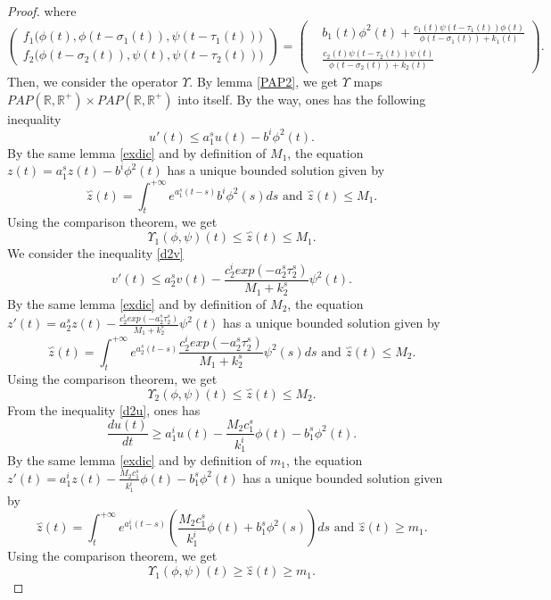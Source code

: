 \documentclass[[a4paper,10pt]{article}
\newcommand{\R}{\mathbb{R}}
\begin{document}
\begin{proof}
where{\small
\[ \left (\begin{aligned}
f_1\big(\phi(t),\phi(t-\sigma_1(t)),\psi(t-\tau_1(t))\big)\\
f_2\big(\phi(t-\sigma_2(t)),\psi(t),\psi(t-\tau_2(t))\big)
\end{aligned}
\right )=
\left (\begin{aligned}
&b_1(t)\phi^2(t)+\frac{c_1(t)\psi(t-\tau_1(t))\phi(t)}{\phi(t-\sigma_1(t))+k_1(t)}\\
&\frac{c_2(t)\psi(t-\tau_2(t))\psi(t)}{\phi(t-\sigma_2(t))+k_2(t)}\end{aligned}
\right).
\]}
Then, we consider the operator $\Upsilon$. 
By lemma \ref{PAP2}, we get $\Upsilon $ maps  $PAP(\R,\R^+)\times PAP(\R,\R^+)$ into itself. By the way, ones has the following inequality 
$$u'(t)\leq a^s_1 u(t)-b^i \phi^2(t).$$
By the same lemma \ref{exdic} and by definition of $M_1$, the equation $z(t)=a^s_1 z(t)-b^i \phi^2(t)$ has a unique bounded solution given by 
$$\overset{\backsim}z(t)=\int^{+\infty}_t e^{a^s_1(t-s)} b^i \phi^2(s)ds \text{ and }\overset{\backsim}z(t)\leq M_1 .$$
Using the comparison theorem, we get 
$$\Upsilon_1(\phi,\psi)(t)\leq \overset{\backsim}z(t)\leq M_1.$$
We consider the inequality \eqref{d2v}
$$v'(t)\leq  a_2^s v(t)-\dfrac{c_2^iexp (-a_2^s \tau_2^s)}{M_1+k_2^s}\psi^2(t).$$
By the same lemma \ref{exdic} and by definition of $M_2$, the equation $z'(t)=a_2^s z(t)-\frac{c_2^iexp(-a_2^s \tau_2^s)}{M_1+k_2^s}\psi^2(t)$ has a unique bounded solution given by 
$$\overset{\backsim}z(t)=\int^{+\infty}_t e^{a^s_2(t-s)}\frac{c_2^iexp(-a_2^s \tau_2^s)}{M_1+k_2^s}\psi^2(s)ds \text{ and }\overset{\backsim}z(t)\leq M_2 .$$
Using the comparison theorem, we get 
$$\Upsilon_2(\phi,\psi)(t)\leq \overset{\backsim}z(t)\leq M_2.$$
 From the inequality \eqref{d2u}, ones has
$$
\dfrac{du(t)}{dt}\geq  a_1^iu(t)-\frac{M_2c_1^s}{k_1^i}\phi(t)-b_1^s\phi^2(t).$$
By the same lemma \ref{exdic} and by definition of $m_1$, the equation $z'(t)=a_1^iz(t)-\frac{M_2c_1^s}{k_1^i}\phi(t)-b_1^s\phi^2(t)$ has a unique bounded solution given by 
$$\overset{\backsim}z(t)=\int^{+\infty}_t e^{a^i_1(t-s)}\left(\frac{M_2c_1^s}{k_1^i}\phi(t)+b_1^s\phi^2(s)\right)ds \text{ and }\overset{\backsim}z(t)\geq m_1 .$$
Using the comparison theorem, we get 
$$\Upsilon_1(\phi,\psi)(t)\geq \overset{\backsim}z(t)\geq m_1.$$


\end{proof}
\end{document}
